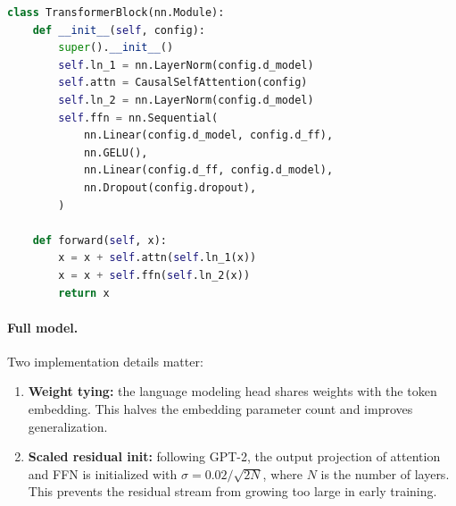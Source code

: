 \begin{lstlisting}[language=python, caption={Pre-LN Transformer block}]
class TransformerBlock(nn.Module):
    def __init__(self, config):
        super().__init__()
        self.ln_1 = nn.LayerNorm(config.d_model)
        self.attn = CausalSelfAttention(config)
        self.ln_2 = nn.LayerNorm(config.d_model)
        self.ffn = nn.Sequential(
            nn.Linear(config.d_model, config.d_ff),
            nn.GELU(),
            nn.Linear(config.d_ff, config.d_model),
            nn.Dropout(config.dropout),
        )

    def forward(self, x):
        x = x + self.attn(self.ln_1(x))
        x = x + self.ffn(self.ln_2(x))
        return x
\end{lstlisting}

\paragraph{Full model.}

Two implementation details matter:
\begin{enumerate}[nosep]
  \item \textbf{Weight tying:} the language modeling head shares weights with the token embedding.
  This halves the embedding parameter count and improves generalization.
  \item \textbf{Scaled residual init:} following GPT-2, the output projection of attention and FFN
  is initialized with $\sigma = 0.02 / \sqrt{2N}$, where $N$ is the number of layers.
  This prevents the residual stream from growing too large in early training.
\end{enumerate}


